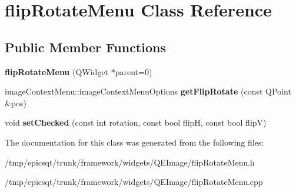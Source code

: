 \hypertarget{classflipRotateMenu}{
\section{flipRotateMenu Class Reference}
\label{classflipRotateMenu}
}
\subsection*{Public Member Functions}
\begin{DoxyCompactItemize}
\item 
\hypertarget{classflipRotateMenu_ae081b477fc71324f7dc8593be4ae320d}{
{\bfseries flipRotateMenu} (QWidget $\ast$parent=0)}
\label{classflipRotateMenu_ae081b477fc71324f7dc8593be4ae320d}

\item 
\hypertarget{classflipRotateMenu_ab7159ea467dde7027a9812799461dcc3}{
imageContextMenu::imageContextMenuOptions {\bfseries getFlipRotate} (const QPoint \&pos)}
\label{classflipRotateMenu_ab7159ea467dde7027a9812799461dcc3}

\item 
\hypertarget{classflipRotateMenu_a028c6c9433580caad8b936e2472b5561}{
void {\bfseries setChecked} (const int rotation, const bool flipH, const bool flipV)}
\label{classflipRotateMenu_a028c6c9433580caad8b936e2472b5561}

\end{DoxyCompactItemize}


The documentation for this class was generated from the following files:\begin{DoxyCompactItemize}
\item 
/tmp/epicsqt/trunk/framework/widgets/QEImage/flipRotateMenu.h\item 
/tmp/epicsqt/trunk/framework/widgets/QEImage/flipRotateMenu.cpp\end{DoxyCompactItemize}
